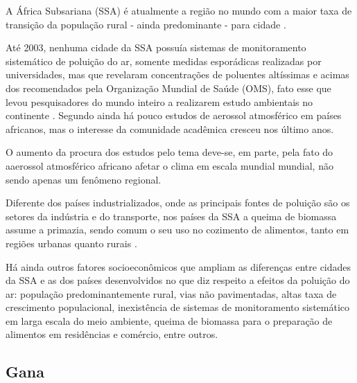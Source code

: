 A África Subsariana (SSA) é atualmente a região no mundo com a maior 
taxa de transição da população rural - ainda predominante - para cidade
\citep{MONTGOMERY2008}. 

Até 2003, nenhuma cidade da SSA possuía sistemas de monitoramento 
sistemático de poluição do ar, somente medidas esporádicas realizadas
por universidades, mas que revelaram concentrações de poluentes altíssimas e 
acimas dos recomendados pela Organização Mundial de Saúde (OMS),
fato esse que levou pesquisadores do mundo inteiro a 
realizarem estudo ambientais no continente \citep{EZZATI2004}. 
Segundo \cite{aboh2009} ainda há pouco estudos de aerossol atmosférico 
em países africanos, mas o interesse da comunidade acadêmica cresceu
nos último anos.
 
O aumento da procura dos estudos pelo tema deve-se, em parte, 
pela fato do aaerossol atmosférico africano afetar o clima 
em escala mundial mundial, não sendo apenas um fenômeno regional.

Diferente dos países industrializados, onde as principais fontes de poluição 
são os setores da indústria e do transporte, nos países da SSA a 
queima de biomassa assume a primazia, sendo comum o seu uso no cozimento 
de alimentos, tanto em regiões urbanas quanto rurais \citep{SMITH2004}. 

Há ainda outros fatores socioeconômicos que ampliam as diferenças entre
cidades da SSA e as dos países desenvolvidos no que diz respeito
a efeitos da poluição do ar: população predominantemente rural,
vias não pavimentadas, altas taxa de crescimento populacional,
inexistência de sistemas de monitoramento sistemático em larga escala do meio 
ambiente, queima de biomassa para o preparação de alimentos em 
residências e comércio, entre outros. 

\subsection{Gana}


